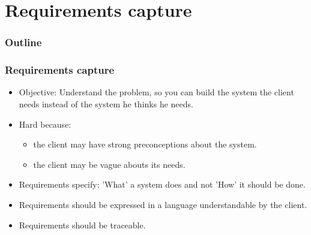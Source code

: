 \documentclass[10pt]{beamer}
\begin{document}
\section{Requirements capture}

\begin{frame}
  \frametitle{Outline}
  \tableofcontents[currentsection]
\end{frame}

\begin{frame}[fragile]
  \frametitle{Requirements capture}
  \begin{itemize}
  \item Objective: Understand the problem,
    so you can build the system the client needs instead of the system he
    thinks he needs.
  \item Hard because:
    \begin{itemize}
    \item the client may have strong preconceptions about the system.
    \item the client may be vague abouts its needs.
    \end{itemize}
  \item Requirements specify: 'What' a system does and not 'How' it should be
      done.
  \item Requirements should be expressed in a language understandable by the
    client.
  \item Requirements should be traceable.
  \end{itemize}
\end{frame}
\end{document}

